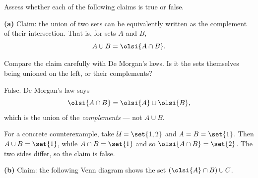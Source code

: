 \documentclass[12pt]{ximera}
\begin{document}
\begin{problem}
Assess whether each of the following claims is true or false.

\begin{prompt}
\textbf{(a)} Claim: the union of two sets can be equivalently written as the
complement of their intersection. That is, for sets $A$ and $B$,
\[ A\cup B = \olsi{A\cap B}. \]

\begin{multipleChoice}
\end{multipleChoice}

\begin{hint}
Compare the claim carefully with De Morgan's laws. Is it the sets themselves being
unioned on the left, or their complements?
\end{hint}

\begin{solution}
False. De Morgan's law says
\[ \olsi{A\cap B} = \olsi{A}\cup\olsi{B}, \]
which is the union of the \emph{complements} --- not $A\cup B$.

For a concrete counterexample, take $\mathcal{U}=\set{1,2}$ and $A=B=\set{1}$. Then
$A\cup B=\set{1}$, while $A\cap B=\set{1}$ and so $\olsi{A\cap B}=\set{2}$. The two
sides differ, so the claim is false.
\end{solution}
\end{prompt}

\begin{prompt}
\textbf{(b)} Claim: the following Venn diagram shows the set
$\left(\olsi{A}\cap B\right)\cup C$.

\begin{center}
\end{center}

\begin{multipleChoice}
\end{multipleChoice}


\end{prompt}
\end{problem}
\end{document}
